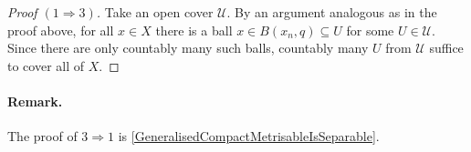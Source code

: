 \begin{proof}[Proof \( (1 \Rightarrow 3) \)]
    Take an open cover \( \mathcal{U} \). By an argument analogous as in the proof above, for all \( x \in X \) there is a ball \(x \in B(x_n, q) \subseteq U \) for some \( U \in \mathcal{U} \). Since there are only countably many such balls, countably many \( U \) from \( \mathcal{U} \) suffice to cover all of \( X \).
\end{proof}

\paragraph{Remark.} The proof of \( 3 \Rightarrow 1 \) is \ref{GeneralisedCompactMetrisableIsSeparable}.
